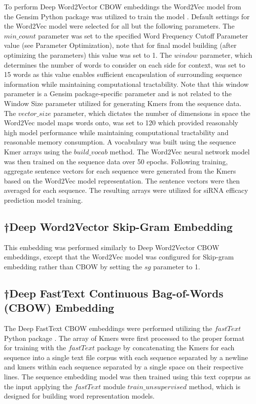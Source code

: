 \documentclass{report}
\begin{document}
To perform Deep Word2Vector CBOW embeddings the Word2Vec model from the Gensim Python package was utilized to train the model \cite{mikolov_efficient_2013,rehurek_software_2010}. Default settings for the Word2Vec model were selected for all but the following parameters. The $min\_count$ parameter was set to the specified Word Frequency Cutoff Parameter value (see Parameter Optimization), note that for final model building (after optimizing the parameters) this value was set to 1. The $window$ parameter, which determines the number of words to consider on each side for context, was set to 15 words as this value enables sufficient encapsulation of surrounding sequence information while maintaining computational tractability. Note that this window parameter is a Gensim package-specific parameter and is not related to the Window Size parameter utilized for generating Kmers from the sequence data. The $vector\_size$ parameter, which dictates the number of dimensions in space the Word2Vec model maps words onto, was set to 120 which provided reasonably high model performance while maintaining computational tractability and reasonable memory consumption. A vocabulary was built using the sequence Kmer arrays using the $build\_vocab$ method. The Word2Vec neural network model was then trained on the sequence data over 50 epochs. Following training, aggregate sentence vectors for each sequence were generated from the Kmers based on the Word2Vec model representation. The sentence vectors were then averaged for each sequence. The resulting arrays were utilized for siRNA efficacy prediction model training.

\subsection{†Deep Word2Vector Skip-Gram Embedding }\label{met:word2vector skip-gram}

This embedding was performed similarly to Deep Word2Vector CBOW embeddings, except that the Word2Vec model was configured for Skip-gram embedding rather than CBOW by setting the $sg$ parameter to 1. 

\subsection{†Deep FastText Continuous Bag-of-Words (CBOW) Embedding}\label{met:fasttext cbow}

The Deep FastText CBOW embeddings were performed utilizing the $fastText$ Python package \cite{bojanowski_enriching_2017}. The array of Kmers were first processed to the proper format for training with the $fastText$ package by concatenating the Kmers for each sequence into a single text file corpus with each sequence separated by a newline and kmers within each sequence separated by a single space on their respective lines. The sequence embedding model was then trained using this text coprpus as the input applying the $fastText$ module $train\_unsupervised$ method, which is designed for building word representation models. 
\end{document}
